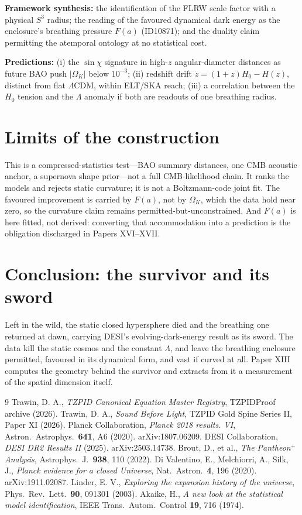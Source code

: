 \documentclass[11pt]{article}
\theoremstyle{remark}
\newcommand{\LCDM}{$\Lambda$CDM}
\newcommand{\OmK}{\Omega_K}
\begin{document}
\textbf{Framework synthesis:} the identification of the FLRW scale factor with a physical $S^3$ radius; the reading of the favoured dynamical dark energy as the enclosure's breathing pressure $F(a)$ (ID10871); and the duality claim permitting the atemporal ontology at no statistical cost.

\textbf{Predictions:} (i) the $\sin\chi$ signature in high-$z$ angular-diameter distances as future BAO push $|\OmK|$ below $10^{-3}$; (ii) redshift drift $\dot z = (1+z)H_0 - H(z)$, distinct from flat \LCDM, within ELT/SKA reach; (iii) a correlation between the $H_0$ tension and the $\Lambda$ anomaly if both are readouts of one breathing radius.
\section{Limits of the construction}
This is a compressed-statistics test---BAO summary distances, one CMB acoustic anchor, a supernova shape prior---not a full CMB-likelihood chain. It ranks the models and rejects static curvature; it is not a Boltzmann-code joint fit. The favoured improvement is carried by $F(a)$, not by $\OmK$, which the data hold near zero, so the curvature claim remains permitted-but-unconstrained. And $F(a)$ is here fitted, not derived: converting that accommodation into a prediction is the obligation discharged in Papers XVI--XVII.
\section{Conclusion: the survivor and its sword}
Left in the wild, the static closed hypersphere died and the breathing one returned at dawn, carrying DESI's evolving-dark-energy result as its sword. The data kill the static cosmos and the constant $\Lambda$, and leave the breathing enclosure permitted, favoured in its dynamical form, and vast if curved at all. Paper XIII computes the geometry behind the survivor and extracts from it a measurement of the spatial dimension itself.
\begin{thebibliography}{9}
 Trawin, D. A., \emph{TZPID Canonical Equation Master Registry}, TZPIDProof archive (2026).
 Trawin, D. A., \emph{Sound Before Light}, TZPID Gold Spine Series II, Paper XI (2026).
 Planck Collaboration, \emph{Planck 2018 results. VI}, Astron.\ Astrophys.\ \textbf{641}, A6 (2020). arXiv:1807.06209.
 DESI Collaboration, \emph{DESI DR2 Results II} (2025). arXiv:2503.14738.
 Brout, D., et al., \emph{The Pantheon$^+$ Analysis}, Astrophys.\ J.\ \textbf{938}, 110 (2022).
 Di Valentino, E., Melchiorri, A., Silk, J., \emph{Planck evidence for a closed Universe}, Nat.\ Astron.\ \textbf{4}, 196 (2020). arXiv:1911.02087.
 Linder, E. V., \emph{Exploring the expansion history of the universe}, Phys.\ Rev.\ Lett.\ \textbf{90}, 091301 (2003).
 Akaike, H., \emph{A new look at the statistical model identification}, IEEE Trans.\ Autom.\ Control \textbf{19}, 716 (1974).
\end{thebibliography}
\end{document}
